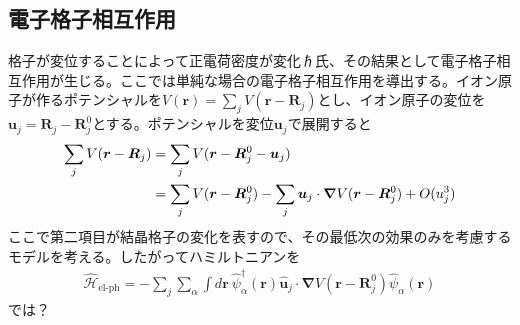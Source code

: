 \documentclass[dvipdfmx, 11pt, a4paper]{jsarticle}
\theoremstyle{definition}
\numberwithin{equation}{section}
\begin{document}
\subsection{電子格子相互作用}
    格子が変位することによって正電荷密度が変化ℏ氏、その結果として電子格子相互作用が生じる。ここでは単純な場合の電子格子相互作用を導出する。イオン原子が作るポテンシャルを$V(\bm{r}) = \sum_j V(\bm{r}-\bm{R}_j)$とし、イオン原子の変位を$\bm{u}_j=\bm{R}_j-\bm{R}_j^0$とする。ポテンシャルを変位$\bm{u}_j$で展開すると
    \begin{align}
        \sum_jV(\bm{r}-\bm{R}_j) &= \sum_jV(\bm{r}-\bm{R}_j^0 - \bm{u}_j) \notag \\
        &= \sum_jV(\bm{r}-\bm{R}_j^0) -\sum_j \bm{u}_j \cdot \bm{\nabla}V(\bm{r}-\bm{R}_j^0) + O(u_j^3)
    \end{align}
    ここで第二項目が結晶格子の変化を表すので、その最低次の効果のみを考慮するモデルを考える。したがってハミルトニアンを
    \begin{align}
        \hat{\mathscr{H}}_{\text{el-ph}} = -\sum_j\sum_\alpha \int d\bm{r}\ \hat{\psi}^\dagger_\alpha(\bm{r}) \hat{\bm{u}}_j \cdot \bm{\nabla}V(\bm{r}-\bm{R}_j^0) \hat{\psi}_\alpha(\bm{r})
    \end{align}
    では？
\end{document}
